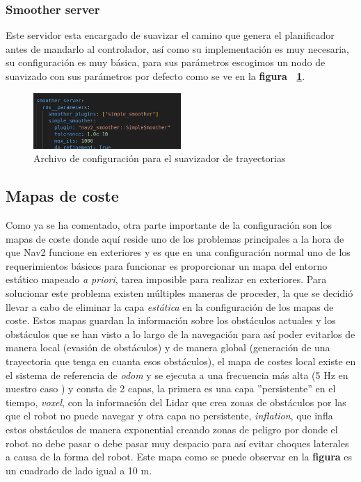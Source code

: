 \subsubsection{Smoother server}
Este servidor esta encargado de suavizar el camino que genera el planificador antes de mandarlo al controlador, así como su implementación es muy necesaria,  
su configuración es muy básica, para sus parámetros escogimos un nodo de suavizado con sus parámetros por defecto como se ve en la \textbf{figura ~\ref{fig:parametros_smoother_server}}.

\begin{figure}[H]
    \centering
    \includegraphics[width=0.5\textwidth]{images/smoother_params.png}
    \caption{Archivo de configuración para el suavizador de trayectorias}
    \label{fig:parametros_smoother_server}
\end{figure}

\subsection{Mapas de coste}
Como ya se ha comentado, otra parte importante de la configuración son los mapas de coste donde aquí reside uno de los problemas principales 
a la hora de que Nav2 funcione en exteriores y es que en una configuración normal uno de los requerimientos básicos para funcionar es proporcionar 
un mapa del entorno estático mapeado \textit{a priori}, tarea imposible para realizar en exteriores. Para solucionar este problema existen múltiples maneras 
de proceder, la que se decidió llevar a cabo de eliminar la capa \textit{estática} en la configuración de los mapas de coste. Estos mapas guardan la 
información sobre los obstáculos actuales y los obstáculos que se han visto a lo largo de la navegación para así poder evitarlos de manera local (evasión de obstáculos) y 
de manera global (generación de una trayectoria que tenga en cuanta esos obstáculos), el mapa de costes local existe en el sistema de referencia de \textit{odom} y se ejecuta 
a una frecuencia más alta (5 Hz en nuestro caso ) y consta de 2 capas, la primera es una capa ''persistente'' en el tiempo, \textit{voxel}, con la información del Lidar que crea zonas de obstáculos por 
las que el robot no puede navegar y otra capa no persistente, \textit{inflation}, que infla estos obstáculos de manera exponential creando zonas 
de peligro por donde el robot no debe pasar o debe pasar muy despacio para así evitar choques laterales a causa de la forma del robot. 
Este mapa como se puede observar en la \textbf{figura } es un cuadrado de lado igual a 10 m.

